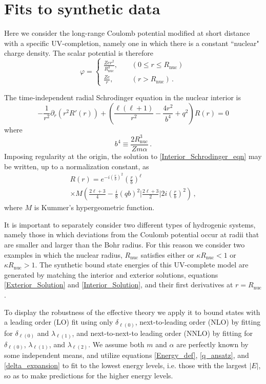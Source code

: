 \documentclass[pra,twocolumn,nofootinbib, superscriptaddress]{revtex4}%
\def\sec#1{\section{#1} }
\def\({\left(}
\def\){\right)}
\def\a{\alpha}
\def\f#1#2{\frac{#1}{#2}}
\def\d{\partial}
\def\de{\delta}
\def\k{\kappa}
\def\l{\lambda}
\providecommand{\abs}[1]{\left\lvert#1\right\rvert}
\begin{document}
\sec{Fits to synthetic data}\label{Sec:EffectiveAndToy}

Here we consider the long-range Coulomb potential modified at short distance with a specific UV-completion, namely one in which there is a constant  ``nuclear" charge density. The scalar potential is therefore
\begin{equation}
\varphi= 
\begin{cases}
\f{Zer^2}{R_\text{nuc}^3},~~~~~&(0\leq r \leq R_\text{nuc})\\
\f{Ze}{r},~~~~~~~&(r>R_\text{nuc})\,.
\end{cases}
\end{equation}

The time-independent radial Schrodinger equation in the nuclear interior is
\begin{equation}\label{Interior_Schrodinger_eqn}
-\f{1}{r^2}\d_r \(r^2 R'(r)\) +\(\f{\ell\(\ell+1\)}{r^2}  -\f{4r^2}{b^4} + q^2\)R(r) =0
\end{equation}
where 
\begin{equation}
b^4\equiv \f{2R_\text{nuc}^3}{Zm\a}\,.
\end{equation}
Imposing regularity at the origin, the solution to \eqref{Interior_Schrodinger_eqn} may be written, up to a normalization constant, as
\begin{multline}\label{Interior_Solution}
R(r) = e^{-i\(\f{r}{b}\)^2} \(\f{r}{b}\)^\ell\\
\times M\(\f{2\ell+3}{4} -\f{i}{8}\(qb\)^2 \Big| \f{2\ell+3}{2} \Big| 2i\(\f{r}{b}\)^2\)  \,,
\end{multline}
where $M$ is Kummer's hypergeometric function.

It is important to separately consider two different types of hydrogenic systems, namely those in which deviations from the Coulomb potential occur at radii that are smaller and larger than the Bohr radius. For this reason we consider two examples in which the nuclear radius, $R_\text{nuc}$ satisfies either or $\k R_\text{nuc}<1$ or $\k R_\text{nuc}>1$. The synthetic bound state energies of this UV-complete model are generated by matching the interior and exterior solutions, equations \eqref{Exterior_Solution} and \eqref{Interior_Solution}, and their first derivatives at $r=R_\text{nuc}$. 





To display the robustness of the effective theory we apply it to bound states with a leading order (LO) fit using only $\de_{\ell(0)}$, next-to-leading order (NLO) by fitting for $\de_{\ell(0)}$ and $\l_{\ell(1)}$, and next-to-next-to leading order (NNLO) by fitting for $\de_{\ell(0)}$, $\l_{\ell(1)}$, and $\l_{\ell(2)}$. We assume both $m$ and $\a$ are perfectly known by some independent means, and utilize equations \eqref{Energy_def}, \eqref{q_ansatz}, and \eqref{delta_expansion} to fit to the lowest energy levels, i.e. those with the largest $\abs{E}$, so as to make predictions for the higher energy levels.
\end{document}

